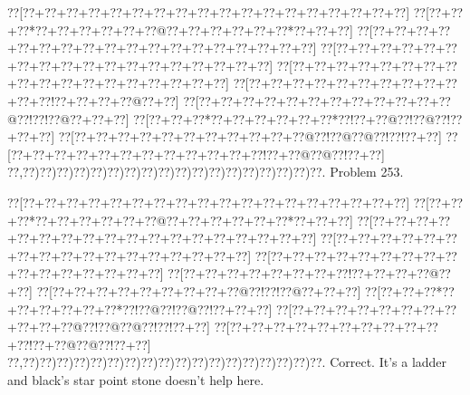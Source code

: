 \documentclass[a5paper]{article}
\begin{document}
\newpage
\begin{center}
{\goo
\0??[\0??+\0??+\0??+\0??+\0??+\0??+\0??+\0??+\0??+\0??+\0??+\0??+\0??+\0??+\0??+\0??+\0??+\0??]
\0??[\0??+\0??+\0??*\0??+\0??+\0??+\0??+\0??+\0??@\0??+\0??+\0??+\0??+\0??+\0??*\0??+\0??+\0??]
\0??[\0??+\0??+\0??+\0??+\0??+\0??+\0??+\0??+\0??+\0??+\0??+\0??+\0??+\0??+\0??+\0??+\0??+\0??]
\0??[\0??+\0??+\0??+\0??+\0??+\0??+\0??+\0??+\0??+\0??+\0??+\0??+\0??+\0??+\0??+\0??+\0??+\0??]
\0??[\0??+\0??+\0??+\0??+\0??+\0??+\0??+\0??+\0??+\0??+\0??+\0??+\0??+\0??+\0??+\0??+\0??+\0??]
\0??[\0??+\0??+\0??+\0??+\0??+\0??+\0??+\0??+\0??+\0??+\0??+\0??!\0??+\0??+\0??+\0??@\0??+\0??]
\0??[\0??+\0??+\0??+\0??+\0??+\0??+\0??+\0??+\0??+\0??+\0??+\0??@\0??!\0??!\0??@\0??+\0??+\0??]
\0??[\0??+\0??+\0??*\0??+\0??+\0??+\0??+\0??+\0??*\0??!\0??+\0??@\0??!\0??@\0??!\0??+\0??+\0??]
\0??[\0??+\0??+\0??+\0??+\0??+\0??+\0??+\0??+\0??+\0??+\0??@\0??!\0??@\0??@\0??!\0??!\0??+\0??]
\0??[\0??+\0??+\0??+\0??+\0??+\0??+\0??+\0??+\0??+\0??+\0??+\0??!\0??+\0??@\0??@\0??!\0??+\0??]
\0??,\0??)\0??)\0??)\0??)\0??)\0??)\0??)\0??)\0??)\0??)\0??)\0??)\0??)\0??)\0??)\0??)\0??)\0??.
}
Problem 253.

\end{center}
\begin{center}
{\goo
\0??[\0??+\0??+\0??+\0??+\0??+\0??+\0??+\0??+\0??+\0??+\0??+\0??+\0??+\0??+\0??+\0??+\0??+\0??]
\0??[\0??+\0??+\0??*\0??+\0??+\0??+\0??+\0??+\0??@\0??+\0??+\0??+\0??+\0??+\0??*\0??+\0??+\0??]
\0??[\0??+\0??+\0??+\0??+\0??+\0??+\0??+\0??+\0??+\0??+\0??+\0??+\0??+\0??+\0??+\0??+\0??+\0??]
\0??[\0??+\0??+\0??+\0??+\0??+\0??+\0??+\0??+\0??+\0??+\0??+\0??+\0??+\0??+\0??+\0??+\0??]
\0??[\0??+\0??+\0??+\0??+\0??+\0??+\0??+\0??+\0??+\0??+\0??+\0??+\0??+\0??+\0??+\0??]
\0??[\0??+\0??+\0??+\0??+\0??+\0??+\0??+\0??!\0??+\0??+\0??+\0??@\0??+\0??]
\0??[\0??+\0??+\0??+\0??+\0??+\0??+\0??+\0??+\0??@\0??!\0??!\0??@\0??+\0??+\0??]
\0??[\0??+\0??+\0??*\0??+\0??+\0??+\0??+\0??+\0??*\0??!\0??@\0??!\0??@\0??!\0??+\0??+\0??]
\0??[\0??+\0??+\0??+\0??+\0??+\0??+\0??+\0??+\0??+\0??+\0??@\0??!\0??@\0??@\0??!\0??!\0??+\0??]
\0??[\0??+\0??+\0??+\0??+\0??+\0??+\0??+\0??+\0??+\0??+\0??!\0??+\0??@\0??@\0??!\0??+\0??]
\0??,\0??)\0??)\0??)\0??)\0??)\0??)\0??)\0??)\0??)\0??)\0??)\0??)\0??)\0??)\0??)\0??)\0??)\0??.
}
Correct. It's a ladder and black's star point stone doesn't help here.

\end{center}
\end{document}

